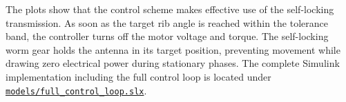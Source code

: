 The plots show that the control scheme makes effective use of the self-locking transmission. As soon as the target rib angle is reached within the tolerance band, the controller turns off the motor voltage and torque. The self-locking worm gear holds the antenna in its target position, preventing movement while drawing zero electrical power during stationary phases. The complete Simulink implementation including the full control loop is located under \href{run:models/full_control_loop.slx}{\nolinkurl{models/full_control_loop.slx}}.